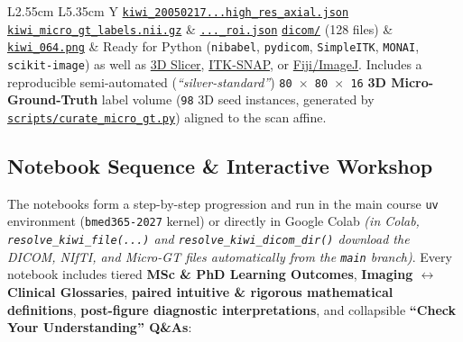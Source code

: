 \documentclass[10pt,a4paper]{article}
\newcommand{\ghblob}{https://github.com/arvidl/BMED365-2027/blob/main}
\newcommand{\ghtree}{https://github.com/arvidl/BMED365-2027/tree/main}
\begin{document}
{\begin{xltabular}{\textwidth}{L{2.55cm} L{5.35cm} Y}
\href{\ghblob/Lab4-Comp-Imag/Kiwi-challenge/data/kiwi_20050217191129_131073_RARE_high_res_axial.json}{\texttt{kiwi\_20050217...high\_res\_axial.json}}\newline
\href{\ghblob/Lab4-Comp-Imag/Kiwi-challenge/data/kiwi_micro_gt_labels.nii.gz}{\texttt{kiwi\_micro\_gt\_labels.nii.gz}} \& \href{\ghblob/Lab4-Comp-Imag/Kiwi-challenge/data/kiwi_micro_gt_roi.json}{\texttt{...\_roi.json}}\newline
\href{\ghtree/Lab4-Comp-Imag/Kiwi-challenge/data/dicom}{\texttt{dicom/}} (128 files) \& \href{\ghblob/Lab4-Comp-Imag/Kiwi-challenge/data/kiwi_064.png}{\texttt{kiwi\_064.png}} &
Ready for Python (\texttt{nibabel}, \texttt{pydicom}, \texttt{SimpleITK}, \texttt{MONAI}, \texttt{scikit-image}) as well as \href{https://www.slicer.org/}{3D Slicer}, \href{http://www.itksnap.org/}{ITK-SNAP}, or \href{https://imagej.net/software/fiji/}{Fiji/ImageJ}. Includes a reproducible semi-automated (\textit{``silver-standard''}) \texttt{80 $\times$ 80 $\times$ 16} \textbf{3D Micro-Ground-Truth} label volume (\texttt{98} 3D seed instances, generated by \href{\ghblob/Lab4-Comp-Imag/Kiwi-challenge/scripts/curate_micro_gt.py}{\texttt{scripts/curate\_micro\_gt.py}}) aligned to the scan affine. \\
\end{xltabular}
}

\subsection{Notebook Sequence \& Interactive Workshop}

The notebooks form a step-by-step progression and run in the main course \texttt{uv} environment (\texttt{bmed365-2027} kernel) or directly in Google Colab \textit{(in Colab, \texttt{resolve\_kiwi\_file(...)} and \texttt{resolve\_kiwi\_dicom\_dir()} download the DICOM, NIfTI, and Micro-GT files automatically from the \texttt{main} branch)}. Every notebook includes tiered \textbf{MSc \& PhD Learning Outcomes}, \textbf{Imaging $\leftrightarrow$ Clinical Glossaries}, \textbf{paired intuitive \& rigorous mathematical definitions}, \textbf{post-figure diagnostic interpretations}, and collapsible \textbf{``Check Your Understanding'' Q\&As}:
\end{document}
